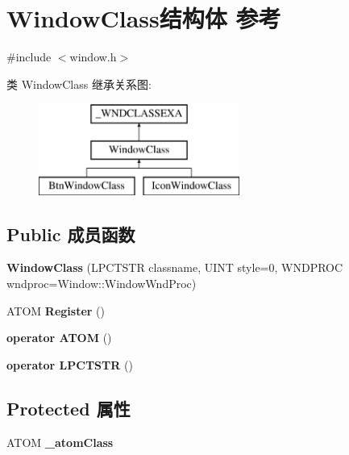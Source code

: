 \hypertarget{struct_window_class}{}\section{Window\+Class结构体 参考}
\label{struct_window_class}


{\ttfamily \#include $<$window.\+h$>$}

类 Window\+Class 继承关系图\+:\begin{figure}[H]
\begin{center}
\leavevmode
\includegraphics[height=3.000000cm]{struct_window_class}
\end{center}
\end{figure}
\subsection*{Public 成员函数}
\begin{DoxyCompactItemize}
\item 
\mbox{\label{struct_window_class_a2e93acebde56c054094bf54f40bda03b}} 
{\bfseries Window\+Class} (L\+P\+C\+T\+S\+TR classname, U\+I\+NT style=0, W\+N\+D\+P\+R\+OC wndproc=Window\+::\+Window\+Wnd\+Proc)
\item 
\mbox{\label{struct_window_class_a1e88ea9d926586608995b88381a3be69}} 
A\+T\+OM {\bfseries Register} ()
\item 
\mbox{\label{struct_window_class_a118cb925cbc21dce88f0ef89d32c1790}} 
{\bfseries operator A\+T\+OM} ()
\item 
\mbox{\label{struct_window_class_aca80547862be760b4ad870b5232176d9}} 
{\bfseries operator L\+P\+C\+T\+S\+TR} ()
\end{DoxyCompactItemize}
\subsection*{Protected 属性}
\begin{DoxyCompactItemize}
\item 
\mbox{\label{struct_window_class_af313e6f19055f88d65ed833dfd46e156}} 
A\+T\+OM {\bfseries \+\_\+atom\+Class}
\end{DoxyCompactItemize}
